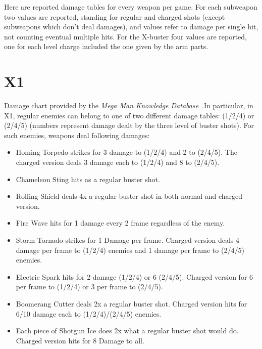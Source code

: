 Here are reported damage tables for every weapon per game. For each subweapon two values are reported, standing for regular and charged shots (except subweapons which don't deal damages), and values refer to damage per single hit, not counting eventual multiple hits. For the X-buster four values are reported, one for each level charge included the one given by the arm parts.


\section{X1}\label{sec:X1_damage}
Damage chart provided by the \emph{Mega Man Knowledge Database}~\cite{wiki:damage_chart_X1}.In particular, in X1, regular enemies can belong to one of two different damage tables: (1/2/4) or (2/4/5) (numbers represent damage dealt by the three level of buster shots).
For such enemies, weapons deal following damages:
\begin{itemize}
	\item Homing Torpedo strikes for 3 damage to (1/2/4) and 2 to (2/4/5).
	The charged version deals 3 damage each to (1/2/4) and 8 to (2/4/5). 
	\item Chameleon Sting hits as a regular buster shot.
	\item Rolling Shield deals 4x a regular buster shot in both normal and charged version.
	\item Fire Wave hits for 1 damage every 2 frame regardless of the enemy.
	\item Storm Tornado strikes for 1 Damage per frame. Charged version deals 4 damage per frame to (1/2/4) enemies and 1 damage per frame to (2/4/5) enemies. 
	\item Electric Spark hits for 2 damage (1/2/4) or 6 (2/4/5). Charged version for 6 per frame to (1/2/4) or 3 per frame to (2/4/5). 
	\item Boomerang Cutter deals 2x a regular buster shot. Charged version hits for	6/10 damage each to (1/2/4)/(2/4/5) enemies.
	\item Each piece  of Shotgun Ice does 2x what a regular buster shot would do. Charged version hits for 8 Damage to all.
\end{itemize}
